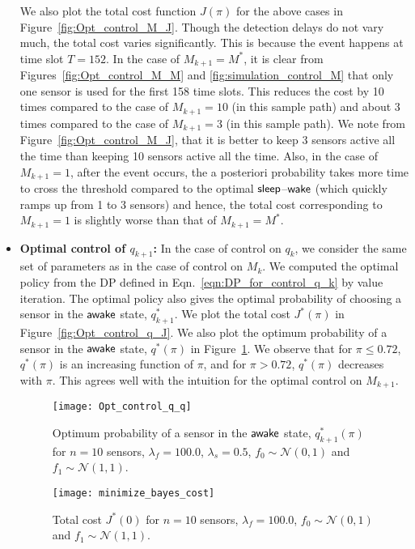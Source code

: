 \documentclass[journal]{IEEEtran}
\newcommand{\sleep}{{${\sf sleep }$}}
\newcommand{\wake}{{${\sf awake }$}}
\begin{document}
\begin{itemize}
We also plot the total cost function $J(\pi)$ for the above cases in 
Figure~\ref{fig:Opt_control_M_J}. Though the detection delays do not vary much, the total 
cost varies significantly. This is because the event happens at time slot 
$T = 152$. In the case of $M_{k+1} =  M^*$, it is clear from 
Figures~\ref{fig:Opt_control_M_M} and \ref{fig:simulation_control_M} that only one sensor 
is used for the first 158 time slots. This reduces the cost by 10 times compared to the
case of $M_{k+1} = 10$  (in this sample path) and about 3 times compared to the 
case of $M_{k+1} = 3$ (in this sample path). We note from Figure~\ref{fig:Opt_control_M_J}, 
that it is better to keep 3 sensors active all the time than keeping 10 
sensors active all the time. Also, in the case of $M_{k+1} = 1$, after
the event occurs, the a
posteriori probability takes more time to cross the threshold compared
to the optimal {\sleep}--{$\sf wake$} (which quickly ramps up from 1 to 3
sensors) and hence, the total cost corresponding to $M_{k+1}=1$ is slightly
worse than that of $M_{k+1} = M^*$.

\item {\bf Optimal control of $q_{k+1}$:}
In the case of control on $q_{k}$, we consider the same set of
parameters as in the case of control on $M_{k}$. We computed the optimal
policy from the DP defined in Eqn.~\ref{eqn:DP_for_control_q_k} by value
iteration. The optimal policy also gives the optimal probability of
choosing a sensor in the {\wake} state, $q^*_{k+1}$.  We plot the total
cost $J^*(\pi)$ in Figure~\ref{fig:Opt_control_q_J}. We also plot the
optimum probability of a sensor in the {\wake} state, $q^*(\pi)$ in
Figure~\ref{fig:Opt_control_q_q}. We observe that for $\pi \leq 0.72$,
$q^*(\pi)$ is an increasing function of $\pi$, and for $\pi > 0.72$,
$q^*(\pi)$ decreases with $\pi$. This agrees well with the intuition for
the optimal control on $M_{k+1}$.

\begin{figure}
\centering
\texttt{[image: Opt\_control\_q\_q]}
\caption{Optimum probability of a sensor in the {\wake} state, $q_{k+1}^*(\pi)$ 
for $n = 10$ sensors, $\lambda_f = 100.0$, $\lambda_s = 0.5$,
$f_0 \sim \mathcal{N}(0,1)$ and $f_1 \sim \mathcal{N}(1,1)$.}
\label{fig:Opt_control_q_q}
\end{figure}

\begin{figure}
\centering
\texttt{[image: minimize\_bayes\_cost]}
\caption{Total cost $J^*(0)$ for $n = 10$ sensors, $\lambda_f = 100.0$,
$f_0 \sim \mathcal{N}(0,1)$ and $f_1 \sim \mathcal{N}(1,1)$.}
\label{fig:minimize_bayes_cost}
\end{figure}






\end{itemize}
\end{document}
